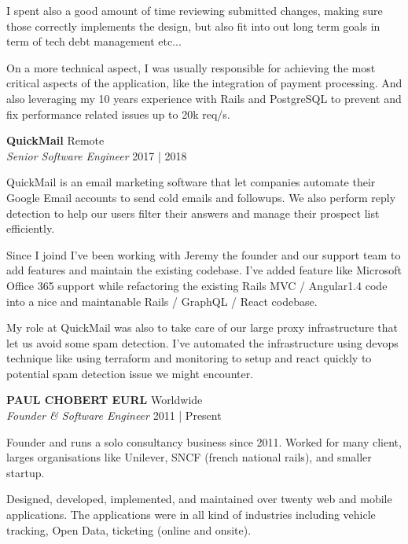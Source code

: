 \documentclass[a4paper]{article}
\begin{document}
I spent also a good amount of time reviewing submitted changes, making sure those correctly implements
the design, but also fit into out long term goals in term of tech debt management etc...

On a more technical aspect, I was usually responsible for achieving the most critical aspects of the application,
like the integration of payment processing. And also leveraging my 10 years experience with Rails and PostgreSQL
to prevent and fix performance related issues up to 20k req/s.

\vspace{2mm}
\raggedbottom

\textbf{QuickMail} \hfill Remote\\
\textit{Senior Software Engineer} \hfill 2017 | 2018\\
\vspace{2mm}

QuickMail is an email marketing software that let companies automate their Google Email accounts to send cold emails and followups.
We also perform reply detection to help our users filter their answers and manage their prospect list efficiently.

Since I joind I've been working with Jeremy the founder and our support team
to add features and maintain the existing codebase.
I've added feature like Microsoft Office 365 support while refactoring the existing
Rails MVC / Angular1.4 code into a nice and maintanable Rails / GraphQL / React codebase.

My role at QuickMail was also to take care of our large proxy infrastructure that let us avoid some spam detection.
I've automated the infrastructure using devops technique like using terraform and monitoring to setup and react quickly
to potential spam detection issue we might encounter.

\vspace{2mm}
\raggedbottom

\textbf{PAUL CHOBERT EURL} \hfill Worldwide\\
\textit{Founder \& Software Engineer} \hfill 2011 | Present\\
\vspace{2mm}

Founder and runs a solo consultancy business since 2011. Worked for many client, larges organisations like Unilever, SNCF (french national rails), and smaller startup.

Designed, developed, implemented, and maintained over twenty web and mobile applications.
The applications were in all kind of industries including vehicle tracking, Open Data, ticketing (online and onsite).
\end{document}
